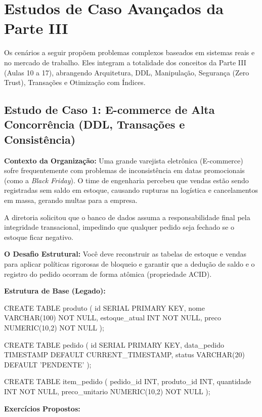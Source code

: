 \section{Estudos de Caso Avançados da Parte III}

Os cenários a seguir propõem problemas complexos baseados em sistemas reais e no mercado de trabalho. Eles integram a totalidade dos conceitos da Parte III (Aulas 10 a 17), abrangendo Arquitetura, DDL, Manipulação, Segurança (Zero Trust), Transações e Otimização com Índices.

\subsection{Estudo de Caso 1: E-commerce de Alta Concorrência (DDL, Transações e Consistência)}

\textbf{Contexto da Organização:}
Uma grande varejista eletrônica (E-commerce) sofre frequentemente com problemas de inconsistência em datas promocionais (como a \textit{Black Friday}). O time de engenharia percebeu que vendas estão sendo registradas sem saldo em estoque, causando rupturas na logística e cancelamentos em massa, gerando multas para a empresa. 

A diretoria solicitou que o banco de dados assuma a responsabilidade final pela integridade transacional, impedindo que qualquer pedido seja fechado se o estoque ficar negativo.

\textbf{O Desafio Estrutural:}
Você deve reconstruir as tabelas de estoque e vendas para aplicar políticas rigorosas de bloqueio e garantir que a dedução de saldo e o registro do pedido ocorram de forma atômica (propriedade ACID).

\textbf{Estrutura de Base (Legado):}
\begin{sqlcode}
CREATE TABLE produto (
    id SERIAL PRIMARY KEY,
    nome VARCHAR(100) NOT NULL,
    estoque_atual INT NOT NULL,
    preco NUMERIC(10,2) NOT NULL
);

CREATE TABLE pedido (
    id SERIAL PRIMARY KEY,
    data_pedido TIMESTAMP DEFAULT CURRENT_TIMESTAMP,
    status VARCHAR(20) DEFAULT 'PENDENTE'
);

CREATE TABLE item_pedido (
    pedido_id INT,
    produto_id INT,
    quantidade INT NOT NULL,
    preco_unitario NUMERIC(10,2) NOT NULL
);
\end{sqlcode}

\textbf{Exercícios Propostos:}

